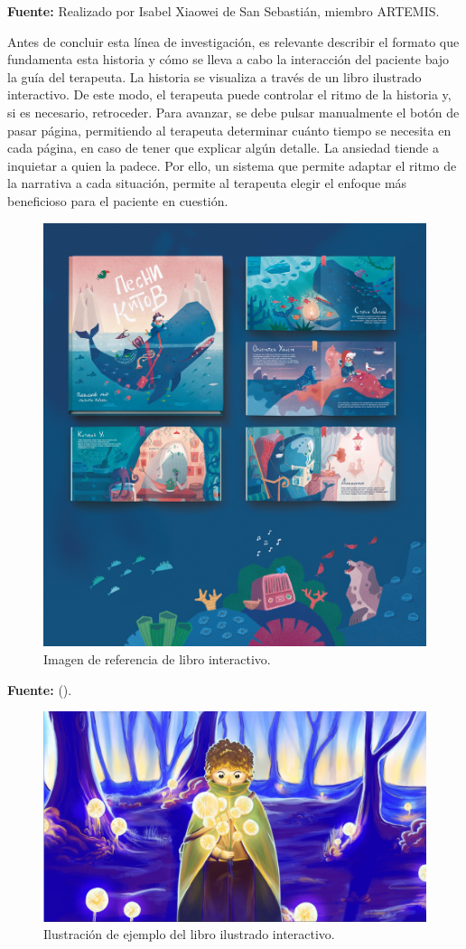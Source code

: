 \begin{center}
	\textbf{Fuente:} Realizado por Isabel Xiaowei de San Sebastián, miembro ARTEMIS.	
\end{center}

Antes de concluir esta línea de investigación, es relevante describir el formato que fundamenta esta historia y cómo se lleva a cabo la interacción del paciente bajo la guía del terapeuta. La historia se visualiza a través de un libro ilustrado interactivo. De este modo, el terapeuta puede controlar el ritmo de la historia y, si es necesario, retroceder. Para avanzar, se debe pulsar manualmente el botón de pasar página, permitiendo al terapeuta determinar cuánto tiempo se necesita en cada página, en caso de tener que explicar algún detalle.
La ansiedad tiende a inquietar a quien la padece. Por ello, un sistema que permite adaptar el ritmo de la narrativa a cada situación, permite al terapeuta elegir el enfoque más beneficioso para el paciente en cuestión.

\begin{figure}[h!]
	\centering
	\includegraphics[width=0.4\linewidth]{Figuras/Desarrollo/ImagenReferenciaLibro.jpg}
	\caption{Imagen de referencia de libro interactivo.}
	\label{fig:LoriRiBook}
	\vspace{-30pt}
\end{figure}

\begin{center}
	\textbf{Fuente:} \citeauthor{LORIRI:2018} (\citeyear{LORIRI:2018}).	
\end{center}

\begin{figure}[h!]
	\centering
	\includegraphics[width=0.5\linewidth]{Figuras/Desarrollo/IlustracionLibro.png}
	\caption{Ilustración de ejemplo del libro ilustrado interactivo.}
	\label{fig:BookIllustration}
	\vspace{-30pt}
\end{figure}

